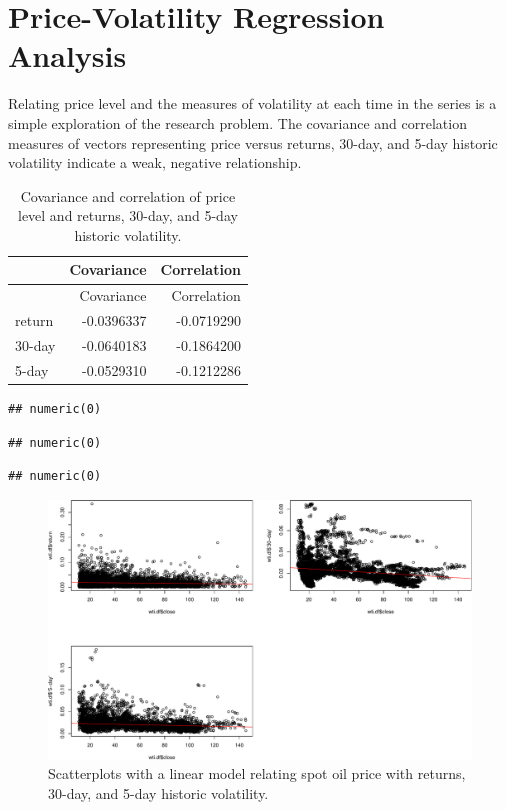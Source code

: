 \documentclass[11pt,]{article}
\begin{document}
\section{Price-Volatility Regression
Analysis}\label{price-volatility-regression-analysis}

Relating price level and the measures of volatility at each time in the
series is a simple exploration of the research problem. The covariance
and correlation measures of vectors representing price versus returns,
30-day, and 5-day historic volatility indicate a weak, negative
relationship.

\begin{longtable}[]{@{}lrr@{}}
\caption{Covariance and correlation of price level and returns, 30-day,
and 5-day historic volatility.}\tabularnewline
\toprule
& Covariance & Correlation\tabularnewline
\midrule
\endfirsthead
\toprule
& Covariance & Correlation\tabularnewline
\midrule
\endhead
return & -0.0396337 & -0.0719290\tabularnewline
30-day & -0.0640183 & -0.1864200\tabularnewline
5-day & -0.0529310 & -0.1212286\tabularnewline
\bottomrule
\end{longtable}

\begin{verbatim}
## numeric(0)
\end{verbatim}

\begin{verbatim}
## numeric(0)
\end{verbatim}

\begin{verbatim}
## numeric(0)
\end{verbatim}

\begin{figure}[htbp]
\centering
\includegraphics{Figs/unnamed-chunk-8-1.pdf}
\caption{Scatterplots with a linear model relating spot oil price with
returns, 30-day, and 5-day historic volatility.}
\end{figure}
\end{document}
